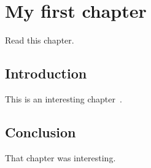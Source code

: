 \chapter[My first chapter]{My first chapter}
\label{chap:chap1}

\chapterabstract
{
Read this chapter.
}

\pagestyle{plain}

\section{Introduction}

This is an interesting chapter~\citep{bradford1976rapid}.

\section{Conclusion}

That chapter was interesting.
